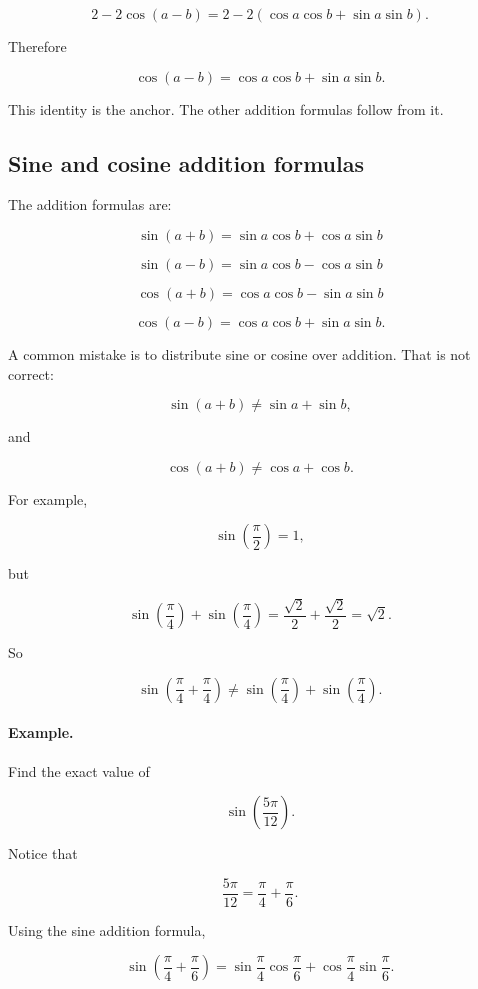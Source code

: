 \[
2-2\cos(a-b)
=
2-2(\cos a\cos b+\sin a\sin b).
\]

Therefore

\[
\boxed{
\cos(a-b)=\cos a\cos b+\sin a\sin b.
}
\]

This identity is the anchor.  The other addition formulas follow from it.

\subsection{Sine and cosine addition formulas}
\label{appsubsec:sine-cosine-addition}

The addition formulas are:

\[
\boxed{
\sin(a+b)=\sin a\cos b+\cos a\sin b
}
\]

\[
\boxed{
\sin(a-b)=\sin a\cos b-\cos a\sin b
}
\]

\[
\boxed{
\cos(a+b)=\cos a\cos b-\sin a\sin b
}
\]

\[
\boxed{
\cos(a-b)=\cos a\cos b+\sin a\sin b.
}
\]

A common mistake is to distribute sine or cosine over addition.  That is not correct:

\[
\sin(a+b)\neq \sin a+\sin b,
\]

and

\[
\cos(a+b)\neq \cos a+\cos b.
\]

For example,

\[
\sin\left(\frac{\pi}{2}\right)=1,
\]

but

\[
\sin\left(\frac{\pi}{4}\right)+\sin\left(\frac{\pi}{4}\right)
=
\frac{\sqrt2}{2}+\frac{\sqrt2}{2}
=
\sqrt2.
\]

So

\[
\sin\left(\frac{\pi}{4}+\frac{\pi}{4}\right)
\neq
\sin\left(\frac{\pi}{4}\right)+\sin\left(\frac{\pi}{4}\right).
\]

\paragraph{Example.}
Find the exact value of

\[
\sin\left(\frac{5\pi}{12}\right).
\]

Notice that

\[
\frac{5\pi}{12}
=
\frac{\pi}{4}+\frac{\pi}{6}.
\]

Using the sine addition formula,

\[
\sin\left(\frac{\pi}{4}+\frac{\pi}{6}\right)
=
\sin\frac{\pi}{4}\cos\frac{\pi}{6}
+
\cos\frac{\pi}{4}\sin\frac{\pi}{6}.
\]

